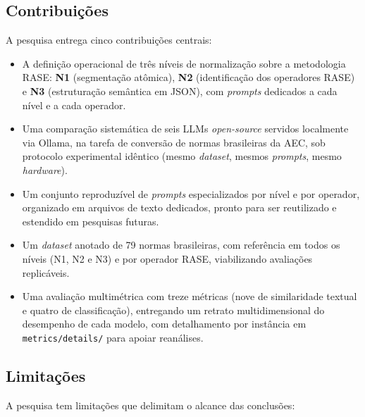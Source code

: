 \documentclass[a4paper,fleqn]{cas-sc}
\begin{document}
\subsection{Contribuições}

A pesquisa entrega cinco contribuições centrais:

\begin{itemize}
    \item A definição operacional de três níveis de normalização sobre a metodologia RASE: \textbf{N1} (segmentação atômica), \textbf{N2} (identificação dos operadores RASE) e \textbf{N3} (estruturação semântica em JSON), com \textit{prompts} dedicados a cada nível e a cada operador.
    \item Uma comparação sistemática de seis LLMs \textit{open-source} servidos localmente via Ollama, na tarefa de conversão de normas brasileiras da AEC, sob protocolo experimental idêntico (mesmo \textit{dataset}, mesmos \textit{prompts}, mesmo \textit{hardware}).
    \item Um conjunto reproduzível de \textit{prompts} especializados por nível e por operador, organizado em arquivos de texto dedicados, pronto para ser reutilizado e estendido em pesquisas futuras.
    \item Um \textit{dataset} anotado de 79 normas brasileiras, com referência em todos os níveis (N1, N2 e N3) e por operador RASE, viabilizando avaliações replicáveis.
    \item Uma avaliação multimétrica com treze métricas (nove de similaridade textual e quatro de classificação), entregando um retrato multidimensional do desempenho de cada modelo, com detalhamento por instância em \texttt{metrics/details/} para apoiar reanálises.
\end{itemize}

\subsection{Limitações}

A pesquisa tem limitações que delimitam o alcance das conclusões:
\end{document}
